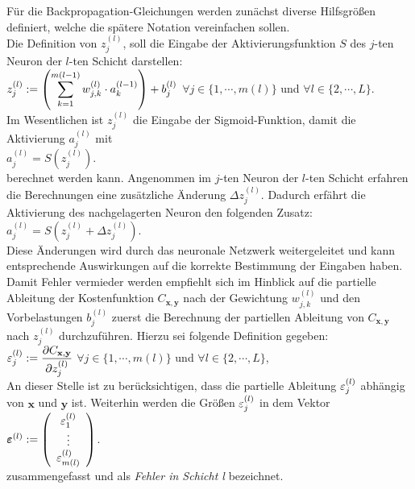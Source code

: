 \noindent
Für die Backpropagation-Gleichungen werden zunächst diverse Hilfsgrößen definiert, welche die spätere Notation vereinfachen sollen. \\
Die Definition von $z_j^{(l)}$, soll die Eingabe der Aktivierungsfunktion $S$ des $j$-ten Neuron der $l$-ten Schicht darstellen:
\\[0.2cm]
\hspace*{1.3cm}
$\displaystyle z_j^{(l)} := \left(\sum\limits_{k=1}^{m(l-1)}  w_{j,k}^{(l)} \cdot a_k^{(l-1)}\right) + b_j^{(l)}$
\quad $\forall j \in \{1, \cdots, m(l)\}$ und $\forall l \in \{2,\cdots,L\}$.
\\[0.2cm]
Im Wesentlichen ist $z_j^{(l)}$ die Eingabe der Sigmoid-Funktion, damit die Aktivierung $a_j^{(l)}$ mit
\\[0.2cm]
\hspace*{1.3cm}
$a_j^{(l)} = S(z_j^{(l)})$.
\\[0.2cm]
berechnet werden kann. Angenommen im $j$-ten Neuron der $l$-ten Schicht erfahren die Berechnungen eine zusätzliche Änderung $\Delta z_j^{(l)}$.  Dadurch erfährt die Aktivierung des nachgelagerten Neuron den folgenden Zusatz: 
\\[0.2cm]
\hspace*{1.3cm}
$a_j^{(l)}=S(z_j^{(l)}+\Delta z_j^{(l)})$.
\\[0.2cm]
Diese Änderungen wird durch das neuronale Netzwerk weitergeleitet und kann entsprechende Auswirkungen auf die korrekte Bestimmung der Eingaben haben. Damit Fehler vermieder werden empfiehlt sich im Hinblick auf die partielle Ableitung der Kostenfunktion $C_{\mathbf{x},\mathbf{y}}$ nach der Gewichtung $w_{j,k}^{(l)}$ und den Vorbelastungen $b_j^{(l)}$ zuerst die Berechnung der partiellen Ableitung von $C_{\mathbf{x},\mathbf{y}}$ nach $z_j^{(l)}$ durchzuführen. Hierzu sei folgende Definition gegeben:
\\[0.2cm]
\hspace*{1.3cm}
$\displaystyle\varepsilon_j^{(l)} := \frac{\partial C_{\mathbf{x}, \mathbf{y}}}{\partial z_j^{(l)}}$ \quad $\forall j \in \{1, \cdots, m(l)\}$ und $\forall l \in \{2,\cdots, L\}$,
\\[0.2cm]
An dieser Stelle ist zu berücksichtigen, dass die partielle Ableitung $\displaystyle\varepsilon_j^{(l)}$ abhängig von $\mathbf{x}$ und $\mathbf{y}$ ist. Weiterhin werden die Größen $\displaystyle\varepsilon_j^{(l)}$ in dem Vektor
\\[0.2cm]
\hspace*{1.3cm}
$\boldsymbol{\varepsilon}^{(l)} := \left(
  \begin{array}[c]{c}
    \varepsilon_1^{(l)}      \\
    \vdots             \\
    \varepsilon_{m(l)}^{(l)}  
  \end{array}
  \right)
$.
\\[0.2cm]
zusammengefasst und als \textit{Fehler in Schicht l} bezeichnet.

